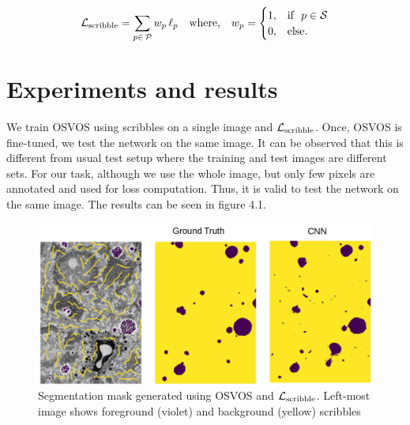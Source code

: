 \begin{equation*}\label{eq:nll_gen}
\mathcal{L}_{\rm{scribble}} = \sum_{p\in\,\mathcal{P}}{w_{p}\, \ell_{p}} \quad \text{where,} \quad  w_{p} = 
\begin{cases}
  1, & \text{if}\ \ p \in \mathcal{S}  \\
  0, & \text{else.}
\end{cases}
\end{equation*}


\section{Experiments and results}
We train OSVOS using scribbles on a single image and $\mathcal{L}_{\rm{scribble}}$. Once, OSVOS is fine-tuned, we test the network on the same image. It can be observed that this is different from usual test setup where the training and test images are different sets. For our task, although we use the whole image, but only few pixels are annotated and used for loss computation. Thus, it is valid to test the network on the same image. The results can be seen in figure 4.1.
\begin{figure}[h!] \label{fig:cnn}
 \includegraphics[width=1.0\linewidth]{figures/cnn1.jpeg} 
\caption{Segmentation mask generated using OSVOS and $\mathcal{L}_{\rm{scribble}}$. Left-most image shows foreground (violet) and background (yellow) scribbles}
\end{figure}

